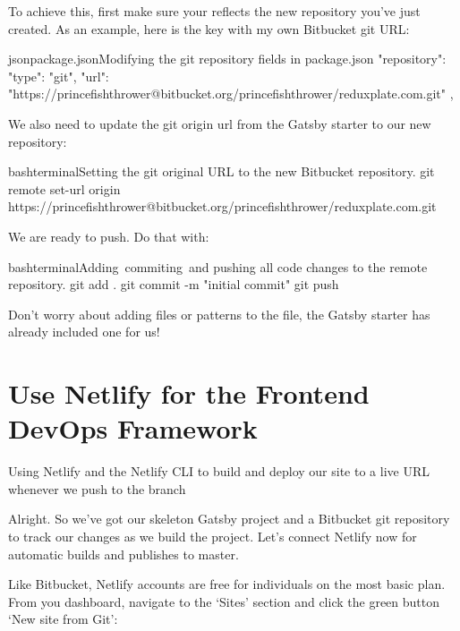\documentclass[paper=6in:9in,pagesize=pdftex,headinclude=on,footinclude=on,12pt,twoside]{scrbook}
\begin{document}
To achieve this, first make sure your  reflects the new repository you've just created. As an example, here is the  key with my own Bitbucket git URL:

\begin{codeInput}{json}{package.json}{Modifying the git repository fields in package.json}
"repository": {
  "type": "git",
  "url": "https://princefishthrower@bitbucket.org/princefishthrower/reduxplate.com.git"
},
\end{codeInput}

We also need to update the git origin url from the Gatsby starter to our new repository:

\begin{codeInput}{bash}{terminal}{Setting the git original URL to the new Bitbucket repository.}
git remote set-url origin https://princefishthrower@bitbucket.org/princefishthrower/reduxplate.com.git
\end{codeInput}

We are ready to push. Do that with:

\begin{codeInput}{bash}{terminal}{Adding\, commiting\, and pushing all code changes to the remote repository.}
git add .
git commit -m "initial commit"
git push
\end{codeInput}

Don't worry about adding files or patterns to the  file, the Gatsby starter has already included one for us!

\section{Use Netlify for the Frontend DevOps Framework}
\begin{arrows}
\item Using Netlify and the Netlify CLI to build and deploy our site to a live URL whenever we push to the  branch
\end{arrows}

Alright. So we've got our skeleton Gatsby project and a Bitbucket git repository to track our changes as we build the project. Let's connect Netlify now for automatic builds and publishes to master.


Like Bitbucket, Netlify accounts are free for individuals on the most basic plan. From you dashboard, navigate to the `Sites' section and click the green button `New site from Git':
\end{document}
